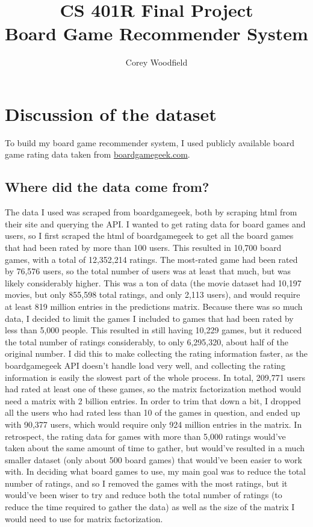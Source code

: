 \documentclass[11pt]{article}
\begin{document}
\def\bs{\textbackslash}
\setlength\parindent{0pt}
\def\reals{\hbox{\rm I\kern-.18em R}}
\def\complexes{\hbox{\rm C\kern-.43em
\vrule depth 0ex height 1.4ex width .05em\kern.41em}}
\def\field{\hbox{\rm I\kern-.18em F}} %
\title{CS 401R Final Project\\
Board Game Recommender System}
\author{Corey Woodfield}
\setcounter{page}{1}
\vspace{1ex}
\maketitle

\section{Discussion of the dataset}
To build my board game recommender system, I used publicly available board game rating data taken from \url{boardgamegeek.com}.
\subsection{Where did the data come from?}
The data I used was scraped from boardgamegeek, both by scraping html from their site and querying the API. I wanted to get rating data for board games and users, so I first scraped the html of boardgamegeek to get all the board games that had been rated by more than 100 users. This resulted in 10,700 board games, with a total of 12,352,214 ratings. The most-rated game had been rated by 76,576 users, so the total number of users was at least that much, but was likely considerably higher. This was a ton of data (the movie dataset had 10,197 movies, but only 855,598 total ratings, and only 2,113 users), and would require at least 819 million entries in the predictions matrix. Because there was so much data, I decided to limit the games I included to games that had been rated by less than 5,000 people. This resulted in still having 10,229 games, but it reduced the total number of ratings considerably, to only 6,295,320, about half of the original number. I did this to make collecting the rating information faster, as the boardgamegeek API doesn't handle load very well, and collecting the rating information is easily the slowest part of the whole process. In total, 209,771 users had rated at least one of these games, so the matrix factorization method would need a matrix with 2 billion entries. In order to trim that down a bit, I dropped all the users who had rated less than 10 of the games in question, and ended up with 90,377 users, which would require only 924 million entries in the matrix. In retrospect, the rating data for games with more than 5,000 ratings would've taken about the same amount of time to gather, but would've resulted in a much smaller dataset (only about 500 board games) that would've been easier to work with. In deciding what board games to use, my main goal was to reduce the total number of ratings, and so I removed the games with the most ratings, but it would've been wiser to try and reduce both the total number of ratings (to reduce the time required to gather the data) as well as the size of the matrix I would need to use for matrix factorization.
\end{document}
